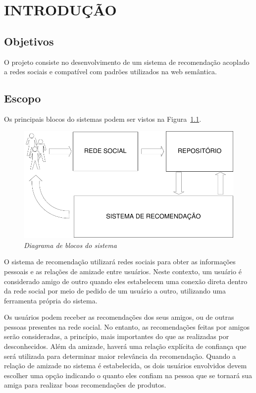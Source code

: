 \chapter{INTRODUÇÃO} 

\section{Objetivos} %

 O projeto consiste no desenvolvimento de um sistema de recomendação acoplado a redes sociais e compatível com padrões utilizados na web semântica.

\section{Escopo}

 Os principais blocos do sistemas podem ser vistos na Figura~\ref{fig:escopo}.

\begin{figure}
  \centering
  \includegraphics[width=\textwidth]{imagens/Diagrama_Visao_Geral}
  \caption{\it Diagrama de blocos do sistema}
  \label{fig:escopo}
\end{figure}


 O sistema de recomendação utilizará redes sociais para obter as informações pessoais e as relações de amizade entre usuários. Neste contexto, um usuário é considerado amigo de outro quando eles estabelecem uma conexão direta dentro da rede social por meio de pedido de um usuário a outro, utilizando uma ferramenta própria do sistema.

 Os usuários podem receber as recomendações dos seus amigos, ou de outras pessoas presentes na rede social. No entanto, as recomendações feitas por amigos serão consideradas, a princípio, mais importantes do que as realizadas por desconhecidos. Além da amizade, haverá uma relação explícita de confiança que será utilizada para determinar maior relevância da recomendação. Quando a relação de amizade no sistema é estabelecida, os dois usuários envolvidos devem escolher uma opção indicando o quanto eles confiam na pessoa que se tornará sua amiga para realizar boas recomendações de produtos.

